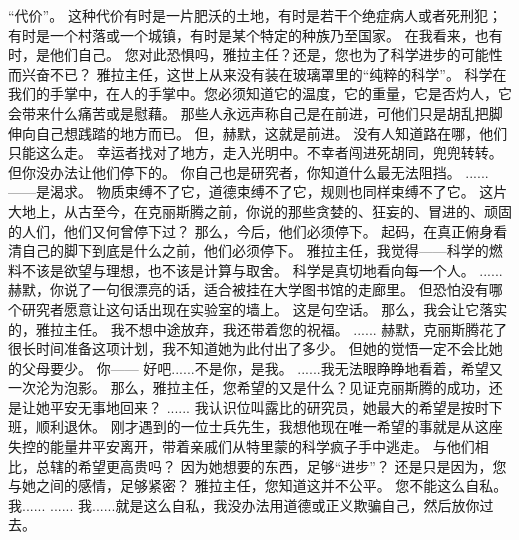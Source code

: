 \documentclass[openany]{book}
\begin{document}
\begin{dialogue}
     “代价”。
     这种代价有时是一片肥沃的土地，有时是若干个绝症病人或者死刑犯；有时是一个村落或一个城镇，有时是某个特定的种族乃至国家。
     在我看来，也有时，是他们自己。
     您对此恐惧吗，雅拉主任？还是，您也为了科学进步的可能性而兴奋不已？
     雅拉主任，这世上从来没有装在玻璃罩里的“纯粹的科学”。
     科学在我们的手掌中，在人的手掌中。您必须知道它的温度，它的重量，它是否灼人，它会带来什么痛苦或是慰藉。
     那些人永远声称自己是在前进，可他们只是胡乱把脚伸向自己想践踏的地方而已。
     但，赫默，这就是前进。
     没有人知道路在哪，他们只能这么走。
     幸运者找对了地方，走入光明中。不幸者闯进死胡同，兜兜转转。
     但你没办法让他们停下的。
     你自己也是研究者，你知道什么最无法阻挡。
     ......
     ——是渴求。
     物质束缚不了它，道德束缚不了它，规则也同样束缚不了它。
     这片大地上，从古至今，在克丽斯腾之前，你说的那些贪婪的、狂妄的、冒进的、顽固的人们，他们又何曾停下过？
     那么，今后，他们必须停下。
     起码，在真正俯身看清自己的脚下到底是什么之前，他们必须停下。
     雅拉主任，我觉得——科学的燃料不该是欲望与理想，也不该是计算与取舍。
     科学是真切地看向每一个人。
     ......
     赫默，你说了一句很漂亮的话，适合被挂在大学图书馆的走廊里。
     但恐怕没有哪个研究者愿意让这句话出现在实验室的墙上。
     这是句空话。
     那么，我会让它落实的，雅拉主任。
     我不想中途放弃，我还带着您的祝福。
     ......
     赫默，克丽斯腾花了很长时间准备这项计划，我不知道她为此付出了多少。
     但她的觉悟一定不会比她的父母要少。
     你——
     好吧......不是你，是我。
     ......我无法眼睁睁地看着，希望又一次沦为泡影。
     那么，雅拉主任，您希望的又是什么？见证克丽斯腾的成功，还是让她平安无事地回来？
     ......
     我认识位叫露比的研究员，她最大的希望是按时下班，顺利退休。
     刚才遇到的一位士兵先生，我想他现在唯一希望的事就是从这座失控的能量井平安离开，带着亲戚们从特里蒙的科学疯子手中逃走。
     与他们相比，总辖的希望更高贵吗？
     因为她想要的东西，足够“进步”？
     还是只是因为，您与她之间的感情，足够紧密？
     雅拉主任，您知道这并不公平。
     您不能这么自私。
     我......
     ......
     我......就是这么自私，我没办法用道德或正义欺骗自己，然后放你过去。

\end{dialogue}
\end{document}
